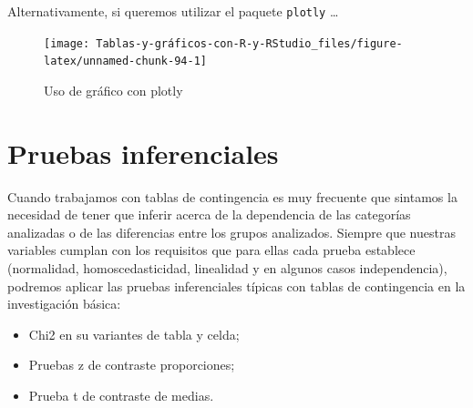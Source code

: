 \documentclass[
]{book}
\newenvironment{Shaded}{\begin{snugshade}}{\end{snugshade}}
\newcommand{\AttributeTok}[1]{\textcolor[rgb]{0.77,0.63,0.00}{#1}}
\newcommand{\FunctionTok}[1]{\textcolor[rgb]{0.00,0.00,0.00}{#1}}
\newcommand{\NormalTok}[1]{#1}
\newcommand{\OtherTok}[1]{\textcolor[rgb]{0.56,0.35,0.01}{#1}}
\newcommand{\SpecialCharTok}[1]{\textcolor[rgb]{0.00,0.00,0.00}{#1}}
\newcommand{\StringTok}[1]{\textcolor[rgb]{0.31,0.60,0.02}{#1}}
\providecommand{\tightlist}{%
  \setlength{\itemsep}{0pt}\setlength{\parskip}{0pt}}
\begin{document}
Alternativamente, si queremos utilizar el paquete \texttt{plotly} \ldots{}

\begin{Shaded}
\end{Shaded}

\begin{figure}[H]

{\centering \texttt{[image: Tablas-y-gráficos-con-R-y-RStudio\_files/figure-latex/unnamed-chunk-94-1]} 

}

\caption{Uso de gráfico con plotly}\label{fig:unnamed-chunk-94}
\end{figure}

\hypertarget{tse07}{%
\chapter{Pruebas inferenciales}\label{tse07}}

Cuando trabajamos con tablas de contingencia es muy frecuente que sintamos la necesidad de tener que inferir acerca de la dependencia de las categorías analizadas o de las diferencias entre los grupos analizados. Siempre que nuestras variables cumplan con los requisitos que para ellas cada prueba establece (normalidad, homoscedasticidad, linealidad y en algunos casos independencia), podremos aplicar las pruebas inferenciales típicas con tablas de contingencia en la investigación básica:

\begin{itemize}
\tightlist
\item
  Chi2 en su variantes de tabla y celda;
\item
  Pruebas z de contraste proporciones;
\item
  Prueba t de contraste de medias.
\end{itemize}
\end{document}
